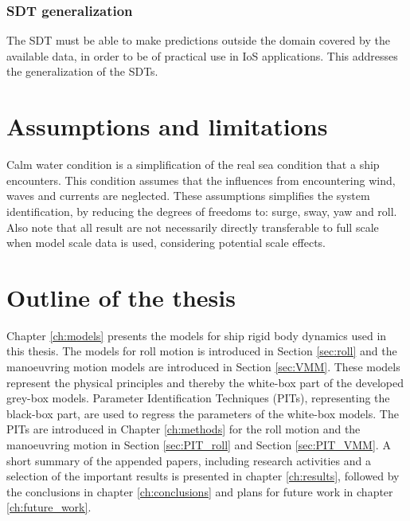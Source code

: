 \subsubsection*{SDT generalization}
The SDT must be able to make predictions outside the domain covered by the available data, in order to be of practical use in IoS applications. This addresses the generalization of the SDTs.

\section{Assumptions and limitations}
Calm water condition is a simplification of the real sea condition that a ship encounters. This condition assumes that the influences from encountering wind, waves and currents are neglected. These assumptions simplifies the system identification, by reducing the degrees of freedoms to: surge, sway, yaw and roll. Also note that all result are not necessarily directly transferable to full scale when model scale data is used, considering potential scale effects. 

\section{Outline of the thesis}
Chapter \ref{ch:models} presents the models for ship rigid body dynamics used in this thesis. The models for roll motion is introduced in Section \ref{sec:roll} and the manoeuvring motion models are introduced in Section \ref{sec:VMM}. These models represent the physical principles and thereby the white-box part of the developed grey-box models.
Parameter Identification Techniques (PITs), representing the black-box part, are used to regress the parameters of the white-box models. The PITs are introduced in Chapter \ref{ch:methods} for the roll motion and the manoeuvring motion in Section \ref{sec:PIT_roll} and Section \ref{sec:PIT_VMM}. 
A short summary of the appended papers, including research activities and a selection of the important results is presented in chapter \ref{ch:results}, followed by the conclusions in chapter \ref{ch:conclusions} and plans for future work in chapter \ref{ch:future_work}.